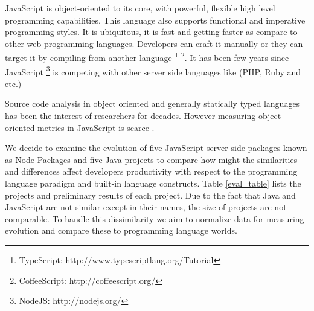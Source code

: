 
JavaScript is object-oriented to its core, with powerful, flexible high level programming capabilities. This language also supports functional and imperative programming styles. It is ubiquitous, it is fast and getting faster as compare to other web programming languages. Developers can craft it manually or they can target it by compiling from another language \footnote{TypeScript: http://www.typescriptlang.org/Tutorial} \footnote{CoffeeScript: http://coffeescript.org/}. It has been few years since JavaScript \footnote{NodeJS: http://nodejs.org/} is competing with other server side languages like (PHP, Ruby and etc.)

Source code analysis in object oriented and generally statically typed languages has been the interest of researchers for decades. However measuring object oriented metrics in JavaScript is scarce \cite{Richards:2010:ADB:1809028.1806598} \cite{6320536}.

We decide to examine the evolution of five JavaScript server-side packages known as Node Packages and five Java projects to compare how might the similarities and differences affect developers productivity with respect to the programming language paradigm and built-in language constructs.  Table \ref{eval_table} lists the projects and preliminary results of each project. Due to the fact that Java and JavaScript are not similar except in their names, the size of projects are not comparable. To handle this dissimilarity we aim to normalize data for measuring evolution and compare these to programming language worlds.